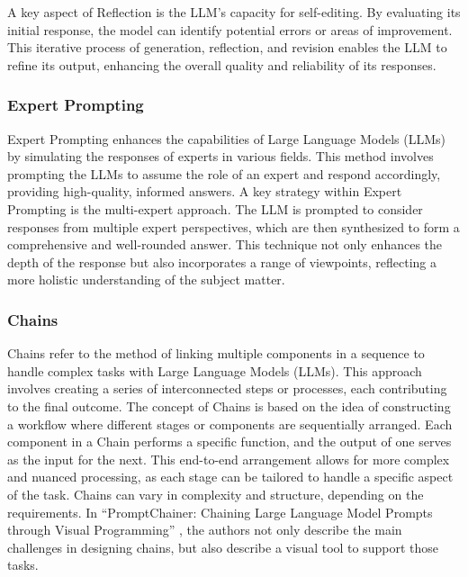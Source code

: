 \documentclass[conference]{IEEEtran}
\begin{document}
A key aspect of Reflection is the LLM's capacity for self-editing. By evaluating its initial response, the model can identify potential errors or areas of improvement. This iterative process of generation, reflection, and revision enables the LLM to refine its output, enhancing the overall quality and reliability of its responses.




\subsubsection{Expert Prompting}
Expert Prompting \cite{zhang2023exploring} enhances the capabilities of Large Language Models (LLMs) by simulating the responses of experts in various fields. This method involves prompting the LLMs to assume the role of an expert and respond accordingly, providing high-quality, informed answers. A key strategy within Expert Prompting is the multi-expert approach. The LLM is prompted to consider responses from multiple expert perspectives, which are then synthesized to form a comprehensive and well-rounded answer. This technique not only enhances the depth of the response but also incorporates a range of viewpoints, reflecting a more holistic understanding of the subject matter.

\subsubsection{Chains}
Chains refer to the method of linking multiple components in a sequence to handle complex tasks with Large Language Models (LLMs). This approach involves creating a series of interconnected steps or processes, each contributing to the final outcome. The concept of Chains is based on the idea of constructing a workflow where different stages or components are sequentially arranged. Each component in a Chain performs a specific function, and the output of one serves as the input for the next. This end-to-end arrangement allows for more complex and nuanced processing, as each stage can be tailored to handle a specific aspect of the task. Chains can vary in complexity and structure, depending on the requirements. In “PromptChainer: Chaining Large Language Model Prompts through Visual Programming” \cite{wu2022promptchainer}, the authors not only describe the main challenges in designing chains, but also describe a visual tool to support those tasks. 
\end{document}
